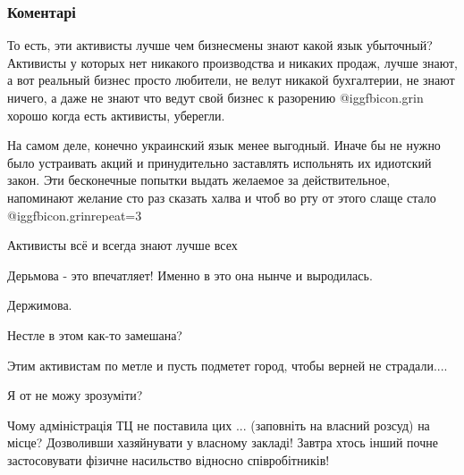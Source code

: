  
 
 
 
 
\subsubsection{Коментарі}
\label{sec:13_10_2021.fb.berdnik_miroslava.1.zaporozhie_mova_akcia.cmt}

\begin{itemize} %

То есть, эти активисты лучше чем бизнесмены знают какой язык убыточный?
Активисты у которых нет никакого производства и никаких продаж, лучше знают, а
вот реальный бизнес просто любители, не велут никакой бухгалтерии, не знают
ничего, а даже не знают что ведут свой бизнес к разорению @igg{fbicon.grin}  хорошо когда есть
активисты, уберегли.

На самом деле, конечно украинский язык менее выгодный. Иначе бы не нужно было
устраивать акций и принудительно заставлять испольнять их идиотский закон. Эти
бесконечные попытки выдать желаемое за действительное, напоминают желание сто
раз сказать халва и чтоб во рту от этого слаще стало @igg{fbicon.grin}{repeat=3} 

\begin{itemize} %
Активисты всё и всегда знают лучше всех
\end{itemize} %

Дерьмова - это впечатляет! Именно в это она нынче и выродилась.

Держимова.

Нестле в этом как-то замешана?

Этим активистам по метле и пусть подметет город, чтобы верней не страдали....


Я от не можу зрозуміти?

Чому адміністрація ТЦ не поставила цих ... (заповніть на власний розсуд) на
місце? Дозволивши хазяйнувати у власному закладі! Завтра хтось інший почне
застосовувати фізичне насильство відносно співробітників!


\end{itemize}
